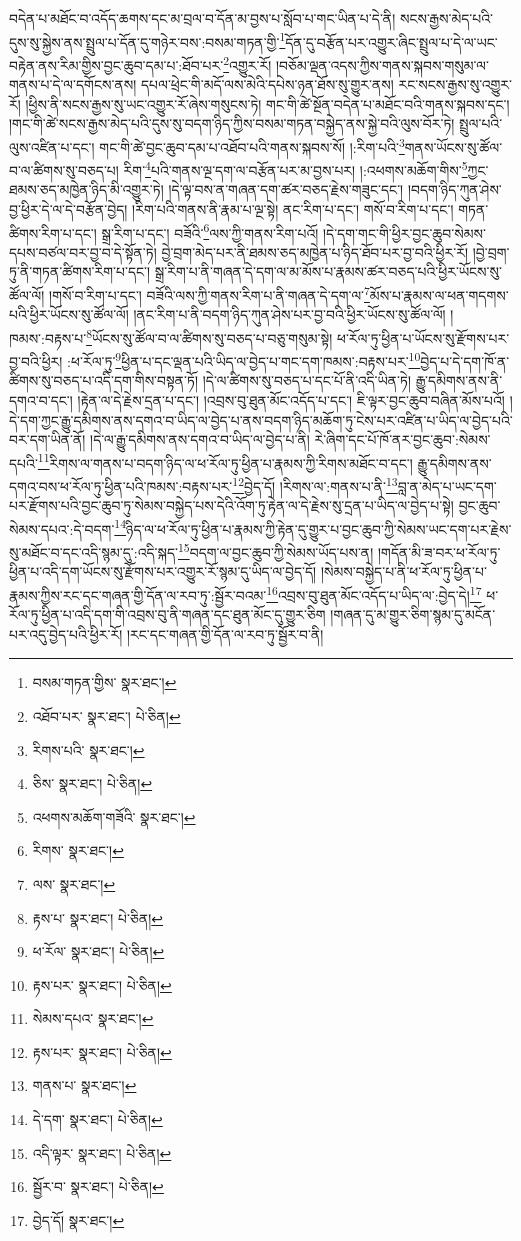 བདེན་པ་མཐོང་བ་འདོད་ཆགས་དང་མ་བྲལ་བ་དོན་མ་བྱས་པ་སློབ་པ་གང་ཡིན་པ་དེ་ནི། སངས་རྒྱས་མེད་པའི་དུས་སུ་སྐྱེས་ནས་སྤྲུལ་པ་དོན་དུ་གཉེར་བས་:བསམ་གཏན་གྱི་\footnote{བསམ་གཏན་གྱིས་  སྣར་ཐང་། }དོན་དུ་བརྩོན་པར་འགྱུར་ཞིང་སྤྲུལ་པ་དེ་ལ་ཡང་བརྟེན་ནས་རིམ་གྱིས་བྱང་ཆུབ་དམ་པ་:ཐོབ་པར་\footnote{འཐོབ་པར་  སྣར་ཐང་།  པེ་ཅིན། }འགྱུར་རོ། །བཅོམ་ལྡན་འདས་ཀྱིས་གནས་སྐབས་གསུམ་ལ་གནས་པ་དེ་ལ་དགོངས་ནས། དཔལ་ཕྲེང་གི་མདོ་ལས་མེའི་དཔེས་ཉན་ཐོས་སུ་གྱུར་ནས། རང་སངས་རྒྱས་སུ་འགྱུར་རོ། །ཕྱིས་ནི་སངས་རྒྱས་སུ་ཡང་འགྱུར་རོ་ཞེས་གསུངས་ཏེ། གང་གི་ཚེ་སྔོན་བདེན་པ་མཐོང་བའི་གནས་སྐབས་དང་། །གང་གི་ཚེ་སངས་རྒྱས་མེད་པའི་དུས་སུ་བདག་ཉིད་ཀྱིས་བསམ་གཏན་བསྐྱེད་ནས་སྐྱེ་བའི་ལུས་བོར་ཏེ། སྤྲུལ་པའི་ལུས་འཛིན་པ་དང་། གང་གི་ཚེ་བྱང་ཆུབ་དམ་པ་འཐོབ་པའི་གནས་སྐབས་སོ། །:རིག་པའི་\footnote{རིགས་པའི་  སྣར་ཐང་། }གནས་ཡོངས་སུ་ཚོལ་བ་ལ་ཚིགས་སུ་བཅད་པ། རིག་\footnote{ཅིས་  སྣར་ཐང་།  པེ་ཅིན། }པའི་གནས་ལྔ་དག་ལ་བརྩོན་པར་མ་བྱས་པར། །:འཕགས་མཆོག་གིས་\footnote{འཕགས་མཆོག་གཟོའི་  སྣར་ཐང་། }ཀྱང་ཐམས་ཅད་མཁྱེན་ཉིད་མི་འགྱུར་ཏེ། །དེ་ལྟ་བས་ན་གཞན་དག་ཚར་བཅད་རྗེས་གཟུང་དང་། །བདག་ཉིད་ཀུན་ཤེས་བྱ་ཕྱིར་དེ་ལ་དེ་བརྩོན་བྱེད། །རིག་པའི་གནས་ནི་རྣམ་པ་ལྔ་སྟེ། ནང་རིག་པ་དང་། གསོ་བ་རིག་པ་དང་། གཏན་ཚིགས་རིག་པ་དང་། སྒྲ་རིག་པ་དང་། བཟོའི་\footnote{རིགས་  སྣར་ཐང་། }ལས་ཀྱི་གནས་རིག་པའོ། །དེ་དག་གང་གི་ཕྱིར་བྱང་ཆུབ་སེམས་དཔས་བཙལ་བར་བྱ་བ་དེ་སྟོན་ཏེ། བྱེ་བྲག་མེད་པར་ནི་ཐམས་ཅད་མཁྱེན་པ་ཉིད་ཐོབ་པར་བྱ་བའི་ཕྱིར་རོ། །བྱེ་བྲག་ཏུ་ནི་གཏན་ཚིགས་རིག་པ་དང་། སྒྲ་རིག་པ་ནི་གཞན་དེ་དག་ལ་མ་མོས་པ་རྣམས་ཚར་བཅད་པའི་ཕྱིར་ཡོངས་སུ་ཚོལ་ལོ། །གསོ་བ་རིག་པ་དང་། བཟོའི་ལས་ཀྱི་གནས་རིག་པ་ནི་གཞན་དེ་དག་ལ་\footnote{ལས་  སྣར་ཐང་། }མོས་པ་རྣམས་ལ་ཕན་གདགས་པའི་ཕྱིར་ཡོངས་སུ་ཚོལ་ལོ། །ནང་རིག་པ་ནི་བདག་ཉིད་ཀུན་ཤེས་པར་བྱ་བའི་ཕྱིར་ཡོངས་སུ་ཚོལ་ལོ། །ཁམས་:བརྟས་པ་\footnote{རྟས་པ་  སྣར་ཐང་།  པེ་ཅིན། }ཡོངས་སུ་ཚོལ་བ་ལ་ཚིགས་སུ་བཅད་པ་བཅུ་གསུམ་སྟེ། ཕ་རོལ་ཏུ་ཕྱིན་པ་ཡོངས་སུ་རྫོགས་པར་བྱ་བའི་ཕྱིར། :ཕ་རོལ་ཏུ་\footnote{ཕ་རོལ་  སྣར་ཐང་།  པེ་ཅིན། }ཕྱིན་པ་དང་ལྡན་པའི་ཡིད་ལ་བྱེད་པ་གང་དག་ཁམས་:བརྟས་པར་\footnote{རྟས་པར་  སྣར་ཐང་།  པེ་ཅིན། }བྱེད་པ་དེ་དག་ཁོ་ན་ཚིགས་སུ་བཅད་པ་འདི་དག་གིས་བསྟན་ཏོ། །དེ་ལ་ཚིགས་སུ་བཅད་པ་དང་པོ་ནི་འདི་ཡིན་ཏེ། རྒྱུ་དམིགས་ནས་ནི་དགའ་བ་དང་། །རྟེན་ལ་དེ་རྗེས་དྲན་པ་དང་། །འབྲས་བུ་ཐུན་མོང་འདོད་པ་དང་། ཇི་ལྟར་བྱང་ཆུབ་བཞིན་མོས་པའོ། །དེ་དག་ཀྱང་རྒྱུ་དམིགས་ནས་དགའ་བ་ཡིད་ལ་བྱེད་པ་ནས་བདག་ཉིད་མཆོག་ཏུ་ངེས་པར་འཛིན་པ་ཡིད་ལ་བྱེད་པའི་བར་དག་ཡིན་ནོ། །དེ་ལ་རྒྱུ་དམིགས་ནས་དགའ་བ་ཡིད་ལ་བྱེད་པ་ནི། རེ་ཞིག་དང་པོ་ཁོ་ནར་བྱང་ཆུབ་:སེམས་དཔའི་\footnote{སེམས་དཔའ་  སྣར་ཐང་། }རིགས་ལ་གནས་པ་བདག་ཉིད་ལ་ཕ་རོལ་ཏུ་ཕྱིན་པ་རྣམས་ཀྱི་རིགས་མཐོང་བ་དང་། རྒྱུ་དམིགས་ནས་དགའ་བས་ཕ་རོལ་ཏུ་ཕྱིན་པའི་ཁམས་:བརྟས་པར་\footnote{རྟས་པར་  སྣར་ཐང་།  པེ་ཅིན། }བྱེད་དོ། །རིགས་ལ་:གནས་པ་ནི་\footnote{གནས་པ་  སྣར་ཐང་། }བླ་ན་མེད་པ་ཡང་དག་པར་རྫོགས་པའི་བྱང་ཆུབ་ཏུ་སེམས་བསྐྱེད་པས་དེའི་འོག་ཏུ་རྟེན་ལ་དེ་རྗེས་སུ་དྲན་པ་ཡིད་ལ་བྱེད་པ་སྟེ། བྱང་ཆུབ་སེམས་དཔའ་:དེ་བདག་\footnote{དེ་དག་  སྣར་ཐང་།  པེ་ཅིན། }ཉིད་ལ་ཕ་རོལ་ཏུ་ཕྱིན་པ་རྣམས་ཀྱི་རྟེན་དུ་གྱུར་པ་བྱང་ཆུབ་ཀྱི་སེམས་ཡང་དག་པར་རྗེས་སུ་མཐོང་བ་དང་འདི་སྙམ་དུ་:འདི་སྐད་\footnote{འདི་ལྟར་  སྣར་ཐང་།  པེ་ཅིན། }བདག་ལ་བྱང་ཆུབ་ཀྱི་སེམས་ཡོད་པས་ན། །གདོན་མི་ཟ་བར་ཕ་རོལ་ཏུ་ཕྱིན་པ་འདི་དག་ཡོངས་སུ་རྫོགས་པར་འགྱུར་རོ་སྙམ་དུ་ཡིད་ལ་བྱེད་དོ། །སེམས་བསྐྱེད་པ་ནི་ཕ་རོལ་ཏུ་ཕྱིན་པ་རྣམས་ཀྱིས་རང་དང་གཞན་གྱི་དོན་ལ་རབ་ཏུ་:སྦྱོར་བའམ་\footnote{སྦྱོར་བ་  སྣར་ཐང་།  པེ་ཅིན། }འབྲས་བུ་ཐུན་མོང་འདོད་པ་ཡིད་ལ་:བྱེད་དེ།\footnote{བྱེད་དོ།  སྣར་ཐང་། } ཕ་རོལ་ཏུ་ཕྱིན་པ་འདི་དག་གི་འབྲས་བུ་ནི་གཞན་དང་ཐུན་མོང་དུ་གྱུར་ཅིག །གཞན་དུ་མ་གྱུར་ཅིག་སྙམ་དུ་མངོན་པར་འདུ་བྱེད་པའི་ཕྱིར་རོ། །རང་དང་གཞན་གྱི་དོན་ལ་རབ་ཏུ་སྦྱོར་བ་ནི། 